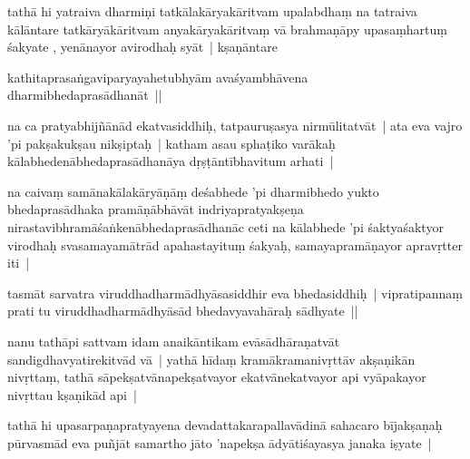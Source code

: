 \documentclass[article,12pt,a4paper]{memoir}%
\newcounter{parCount}
\begin{document}
	  \pstart \leavevmode%
	\label{thakur75-78.30}tathā hi yatraiva dharmiṇi tatkālakāryakāritvam upalabdhaṃ na tatraiva kālāntare tatkāryākāritvam anyakāryakāritvaṃ vā brahmaṇāpy upasaṃhartuṃ śakyate , yenānayor avirodhaḥ syāt | kṣaṇāntare
	{}
	\pend%
      

	  \pstart \leavevmode%
	kathitaprasaṅgaviparyayahetubhyām avaśyambhāvena dharmibhedaprasādhanāt ||
	{}
	\pend%
      

	  \pstart \leavevmode%
	\label{thakur75-79.3}na ca pratyabhijñānād ekatvasiddhiḥ, tatpauruṣasya nirmūlitatvāt | ata eva vajro 'pi pakṣakukṣau nikṣiptaḥ | katham asau sphaṭiko varākaḥ kālabhedenābhedaprasādhanāya dṛṣṭāntībhavitum arhati | 
	{}
	\pend%
      

	  \pstart \leavevmode%
	\label{thakur75-79.5}na caivaṃ samānakālakāryāṇāṃ deśabhede 'pi dharmibhedo yukto bhedaprasādhaka pramāṇābhāvāt indriyapratyakṣeṇa nirastavibhramāśaṅkenābhedaprasādhanāc ceti na kālabhede 'pi śaktyaśaktyor virodhaḥ svasamayamātrād apahastayituṃ śakyaḥ, samayapramāṇayor apravṛtter iti |
	{}
	\pend%
      

	  \pstart \leavevmode%
	\label{thakur75-79.9}tasmāt sarvatra viruddhadharmādhyāsasiddhir eva bhedasiddhiḥ | vipratipannaṃ prati tu viruddhadharmādhyāsād bhedavyavahāraḥ sādhyate ||
	{}
	\pend%
      

	  \pstart \leavevmode%
	\label{thakur75-79.11}nanu tathāpi sattvam idam anaikāntikam evāsādhāraṇatvāt sandigdhavyatirekitvād vā | yathā hīdaṃ kramākramanivṛttāv akṣaṇikān nivṛttaṃ, tathā sāpekṣatvānapekṣatvayor ekatvānekatvayor api vyāpakayor nivṛttau kṣaṇikād api | 
	{}
	\pend%
      

	  \pstart \leavevmode%
	\label{thakur75-79.13}tathā hi upasarpaṇapratyayena devadattakarapallavādinā sahacaro bījakṣaṇaḥ pūrvasmād eva puñjāt samartho jāto 'napekṣa ādyātiśayasya janaka iṣyate | 
	{}
	\pend%
      
\end{document}
